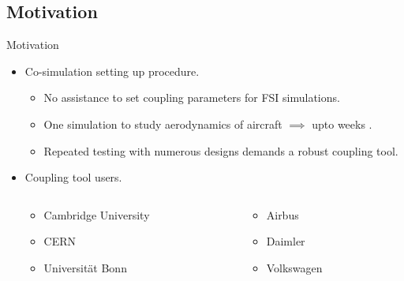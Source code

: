\documentclass[10pt]{beamer}
\begin{document}
\subsection{Motivation}
\begin{frame}[t]{Motivation}
\begin{itemize}
\item <1- > Co-simulation setting up procedure.
\newline
\begin{itemize}
\item No assistance to set coupling parameters for FSI simulations. 
\newline
\item One simulation to study aerodynamics of aircraft $\implies$ upto weeks \cite{aerodynamics_time} \cite{EGO_Basepaper}.
\newline
\item Repeated testing with numerous designs demands a robust coupling tool.
\newline
\end{itemize}
\item <2- >Coupling tool users.
\begin{columns}[T] %
\begin{column}{.32\textwidth}
\begin{itemize}
    \item Cambridge University
    \newline
    \item CERN
    \newline
    \item Universität Bonn
\end{itemize}
\end{column}%
\hfill%
\begin{column}{.4\textwidth}

\begin{itemize}
    \item Airbus
    \newline
    \item Daimler
    \newline
    \item Volkswagen
    
\end{itemize}
\end{column}%
\end{columns}

\end{itemize}
\end{frame}
\end{document}
